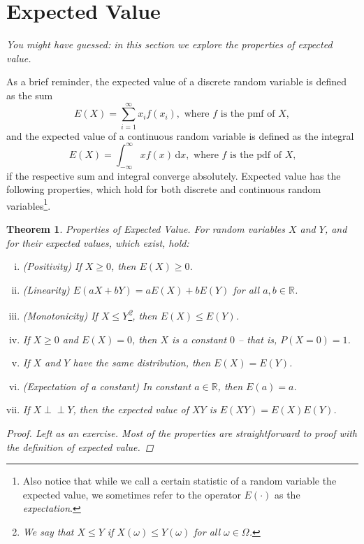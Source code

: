 \documentclass[12pt,a4paper,leqno]{report}
\newcommand{\R}{\mathbb{R}}
\newcommand{\dif}{\,\mathrm{d}}
\def\independent{\perp\!\!\!\perp}
\theoremstyle{plain}
\newtheorem{lause}[equation]{Theorem}
\theoremstyle{definition}
\begin{document}
\section{Expected Value}

\emph{You might have guessed: in this section we explore the properties of expected value.}

As a brief reminder, the expected value of a discrete random variable is defined as the sum 
\[
E(X) = \sum_{i=1}^\infty x_i f(x_i), \text{ where } f \text{ is the pmf of $X$}, 
\]
and the expected value of a continuous random variable is defined as the integral 
\[
E(X) = \int_{-\infty}^\infty x f(x) \dif x, \text{ where } f \text{ is the pdf of $X$,}
\]
if the respective sum and integral converge absolutely. Expected value has the following properties, which hold for both discrete and continuous random variables\footnote{Also notice that while we call a certain statistic of a random variable the expected value, we sometimes refer to the operator $E(\cdot)$ as the \emph{expectation}.}.

\begin{lause}
\label{lause:expected_value_properties}
Properties of Expected Value.  For random variables $X$ and $Y$, and for their expected values, which exist, hold:
\begin{enumerate}[(i)]
\item (Positivity) If $X \geq 0$, then $E(X) \geq 0$.
\item (Linearity) $E(aX + bY) = aE(X) + bE(Y)$ for all $a,b \in \R$.
\item (Monotonicity) If $X \leq Y$\footnote{We say that $X \leq Y$ if $X(\omega) \leq Y(\omega)$ for all $\omega \in \Omega$.}, then $E(X) \leq E(Y)$.
\item If $X \geq 0$ and $E(X) = 0$, then $X$ is a constant $0$ -- that is, $P(X=0) = 1$.
\item If $X$ and $Y$ have the same distribution, then $E(X) = E(Y)$.
\item (Expectation of a constant) In constant $a \in \mathbb{R}$, then $E(a) = a$.
\item If $X \independent Y$, then the expected value of $XY$ is $E(XY) = E(X)E(Y)$.
\end{enumerate}
\begin{proof}
Left as an exercise. Most of the properties are straightforward to proof with the definition of expected value. 
\end{proof}
\end{lause}
\end{document}
